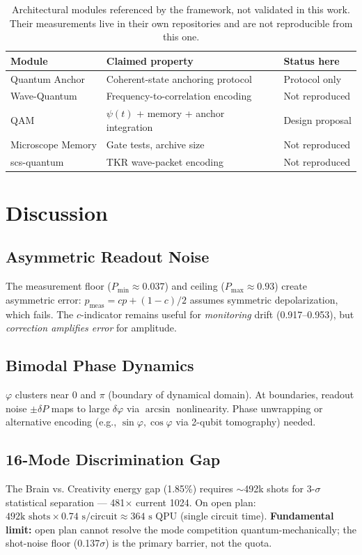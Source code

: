 \documentclass[sigconf,anonymous=false]{acmart}
\begin{document}
\begin{table}[h]
\centering
\caption{Architectural modules referenced by the framework, not validated in this work. Their measurements live in their own repositories and are not reproducible from this one.}
\label{tab:notvalidated}
\begin{tabular}{lll}
\toprule
Module & Claimed property & Status here \\
\midrule
Quantum Anchor & Coherent-state anchoring protocol & Protocol only \\
Wave-Quantum & Frequency-to-correlation encoding & Not reproduced \\
QAM & $\psi(t)$ + memory + anchor integration & Design proposal \\
Microscope Memory & Gate tests, archive size & Not reproduced \\
scs-quantum & TKR wave-packet encoding & Not reproduced \\
\bottomrule
\end{tabular}
\end{table}

\section{Discussion}

\subsection{Asymmetric Readout Noise}
The measurement floor ($P_\text{min} \approx 0.037$) and ceiling ($P_\text{max} \approx 0.93$) create asymmetric error: $p_\text{meas} = c p + (1-c)/2$ assumes symmetric depolarization, which fails. The $c$-indicator remains useful for \emph{monitoring} drift (0.917--0.953), but \emph{correction amplifies error} for amplitude.

\subsection{Bimodal Phase Dynamics}
\label{sec:phase}
$\varphi$ clusters near $0$ and $\pi$ (boundary of dynamical domain). At boundaries, readout noise $\pm \delta P$ maps to large $\delta\varphi$ via $\arcsin$ nonlinearity. Phase unwrapping or alternative encoding (e.g., $\sin\varphi, \cos\varphi$ via 2-qubit tomography) needed.

\subsection{16-Mode Discrimination Gap}
The Brain vs. Creativity energy gap (1.85\%) requires $\sim$492k shots for 3-$\sigma$ statistical separation --- 481$\times$ current 1024. On open plan: $492\text{k shots} \times 0.74\text{ s/circuit} \approx 364\text{ s QPU}$ (single circuit time). \textbf{Fundamental limit:} open plan cannot resolve the mode competition quantum-mechanically; the shot-noise floor (0.137$\sigma$) is the primary barrier, not the quota.
\end{document}
